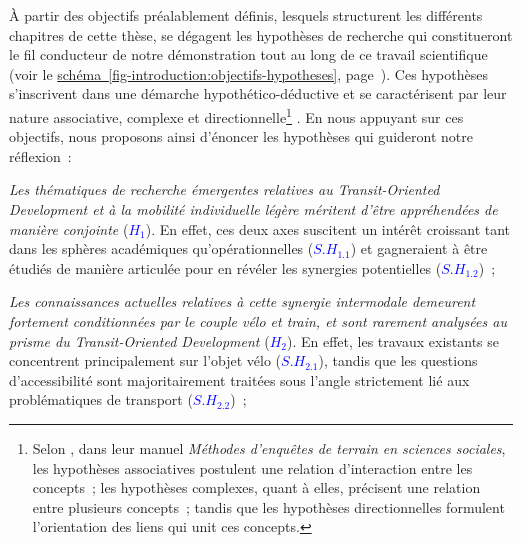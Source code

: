 \begin{refsegment}
À partir des objectifs préalablement définis, lesquels structurent les différents chapitres de cette thèse, se dégagent les hypothèses de recherche qui constitueront le fil conducteur de notre démonstration tout au long de ce travail scientifique (voir le \hyperref[fig-introduction:objectifs-hypotheses]{schéma~\ref{fig-introduction:objectifs-hypotheses}}, page~\pageref{fig-introduction:objectifs-hypotheses}). Ces hypothèses s’inscrivent dans une démarche hypothético-déductive et se caractérisent par leur nature associative, complexe et directionnelle\footnote{
    Selon \textcolor{blue}{\textcite[41-43]{tomini_methodes_2020}}, dans leur manuel \textsl{Méthodes d'enquêtes de terrain en sciences sociales}, les hypothèses associatives postulent une relation d'interaction entre les concepts~; les hypothèses complexes, quant à elles, précisent une relation entre plusieurs concepts~; tandis que les hypothèses directionnelles formulent l'orientation des liens qui unit ces concepts.
} \textcolor{blue}{\autocite[43]{tomini_methodes_2020}}. En nous appuyant sur ces objectifs, nous proposons ainsi d’énoncer les hypothèses qui guideront notre réflexion~:
        \begin{customitemize}
    \item \textsl{Les thématiques de recherche émergentes relatives au \textsl{Transit-Oriented Development} et à la mobilité individuelle légère méritent d’être appréhendées de manière conjointe} ({\textcolor{blue}{\(H_1\)}\label{hypothese-1}}). En effet, ces deux axes suscitent un intérêt croissant tant dans les sphères académiques qu'opérationnelles ({\textcolor{blue}{\(S.H_{1.1}\)}\label{sous-hypothese-1.1}}) et gagneraient à être étudiés de manière articulée pour en révéler les synergies potentielles ({\textcolor{blue}{\(S.H_{1.2}\)}\label{sous-hypothese-1.2}})~;
    \item \textsl{Les connaissances actuelles relatives à cette synergie intermodale demeurent fortement conditionnées par le couple vélo et train, et sont rarement analysées au prisme du \textsl{Transit-Oriented Development}} ({\textcolor{blue}{\(H_2\)}\label{hypothese-2}}). En effet, les travaux existants se concentrent principalement sur l'objet vélo ({\textcolor{blue}{\(S.H_{2.1}\)}\label{sous-hypothese-2.1}}), tandis que les questions d’accessibilité sont majoritairement traitées sous l’angle strictement lié aux problématiques de transport ({\textcolor{blue}{\(S.H_{2.2}\)}\label{sous-hypothese-2.2}})~;

\end{customitemize}
\end{refsegment}
